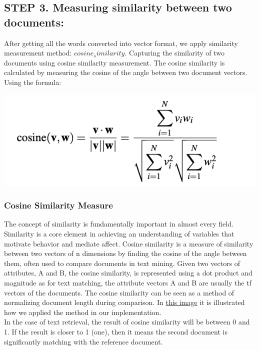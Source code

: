 \subsection*{STEP 3. Measuring similarity between two documents: }
After getting all the words converted into vector format, we apply similarity measurement method: $cosine_similarity$. Capturing the similarity of two documents using cosine similarity measurement. The cosine similarity is calculated by measuring the cosine of the angle between two document vectors. Using the formula: 
\begin{center}
    \includegraphics{formula.png}
\end{center}
\subsubsection{Cosine Similarity Measure}
The concept of similarity is fundamentally important in almost every field. Similarity is a core element in achieving an understanding of variables that motivate behavior and mediate affect. 
Cosine similarity is a measure of similarity between two vectors of n dimensions by finding the cosine of the angle between them, often used to compare documents in text mining. Given two vectors of attributes, A and B, the cosine similarity, is represented using a dot product and magnitude
as for text matching, the attribute vectors A and B are usually the tf vectors of the documents. The cosine similarity can be seen as a method of normalizing document length during comparison.
In \hyperlink{thisimage}{this image} it is illustrated how we applied the method in our implementation.\\
In the case of text retrieval, the result of cosine similarity will be between 0 and 1. If the result is closer to 1 (one), then it means the second document is significantly matching with the  reference
document.

